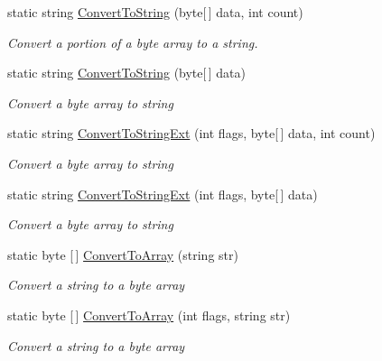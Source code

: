 \begin{DoxyCompactItemize}
\item 
static string \hyperlink{class_i_c_sharp_code_1_1_sharp_zip_lib_1_1_zip_1_1_zip_constants_ae68d920017541e00bf7ef9a04ae70ad6}{Convert\+To\+String} (byte\mbox{[}$\,$\mbox{]} data, int count)
\begin{DoxyCompactList}\small\item\em Convert a portion of a byte array to a string. \end{DoxyCompactList}\item 
static string \hyperlink{class_i_c_sharp_code_1_1_sharp_zip_lib_1_1_zip_1_1_zip_constants_a992591a74674d7c5c0f40f7131828377}{Convert\+To\+String} (byte\mbox{[}$\,$\mbox{]} data)
\begin{DoxyCompactList}\small\item\em Convert a byte array to string \end{DoxyCompactList}\item 
static string \hyperlink{class_i_c_sharp_code_1_1_sharp_zip_lib_1_1_zip_1_1_zip_constants_a8c21dda28bd9df475755e3e534eb33cf}{Convert\+To\+String\+Ext} (int flags, byte\mbox{[}$\,$\mbox{]} data, int count)
\begin{DoxyCompactList}\small\item\em Convert a byte array to string \end{DoxyCompactList}\item 
static string \hyperlink{class_i_c_sharp_code_1_1_sharp_zip_lib_1_1_zip_1_1_zip_constants_acc1adc9b5927c38c8eb9d98aaab058ea}{Convert\+To\+String\+Ext} (int flags, byte\mbox{[}$\,$\mbox{]} data)
\begin{DoxyCompactList}\small\item\em Convert a byte array to string \end{DoxyCompactList}\item 
static byte \mbox{[}$\,$\mbox{]} \hyperlink{class_i_c_sharp_code_1_1_sharp_zip_lib_1_1_zip_1_1_zip_constants_a01022ba5b96baff1480a068a3368d9ea}{Convert\+To\+Array} (string str)
\begin{DoxyCompactList}\small\item\em Convert a string to a byte array \end{DoxyCompactList}\item 
static byte \mbox{[}$\,$\mbox{]} \hyperlink{class_i_c_sharp_code_1_1_sharp_zip_lib_1_1_zip_1_1_zip_constants_aabd972cf063c86c2ef2b9fd32ba393c7}{Convert\+To\+Array} (int flags, string str)
\begin{DoxyCompactList}\small\item\em Convert a string to a byte array \end{DoxyCompactList}\item 

\end{DoxyCompactItemize}
